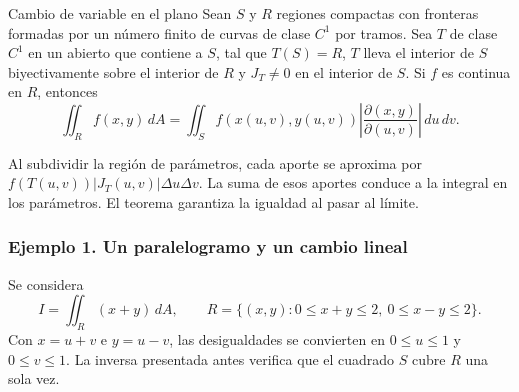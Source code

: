 \begin{mytheorem}{Cambio de variable en el plano}
Sean $S$ y $R$ regiones compactas con fronteras formadas por un número finito de curvas de clase $C^1$ por tramos. Sea $T$ de clase $C^1$ en un abierto que contiene a $S$, tal que $T(S)=R$, $T$ lleva el interior de $S$ biyectivamente sobre el interior de $R$ y $J_T\ne0$ en el interior de $S$. Si $f$ es continua en $R$, entonces
\[
\iint_R f(x,y)\,dA
=\iint_S f(x(u,v),y(u,v))
\left|\frac{\partial(x,y)}{\partial(u,v)}\right|\,du\,dv.
\]
\end{mytheorem}

Al subdividir la región de parámetros, cada aporte se aproxima por $f(T(u,v))|J_T(u,v)|\Delta u\Delta v$. La suma de esos aportes conduce a la integral en los parámetros. El teorema garantiza la igualdad al pasar al límite.

\subsubsection{Ejemplo 1. Un paralelogramo y un cambio lineal}

Se considera
\[
I=\iint_R(x+y)\,dA,
\qquad R=\{(x,y):0\leq x+y\leq2,\ 0\leq x-y\leq2\}.
\]
Con $x=u+v$ e $y=u-v$, las desigualdades se convierten en $0\leq u\leq1$ y $0\leq v\leq1$. La inversa presentada antes verifica que el cuadrado $S$ cubre $R$ una sola vez.

\begingroup
\shorthandoff{>}
\begin{center}
\end{center}
\endgroup

